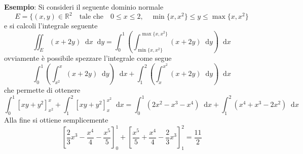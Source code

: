 \documentclass[a4paper]{extarticle}
\newcommand*\dif{\mathop{}\!\mathrm{d}}
\begin{document}
\vspace{2em}
\noindent
\textbf{Esempio}: Si consideri il seguente dominio normale
\[E=\{(x,y) \in \mathbb{R}^2 \hspace{1em} \text{tale che} \hspace{1em} 0 \leq x \leq 2, \hspace{1em} \min\{x,x^2\} \leq y \leq \max\{x,x^2\}\]
e si calcoli l'integrale seguente
\[\iint_E (x+2y) \dif x \dif y = \int_0^1 \left(\int_{\min\{x,x^2\}}^{\max\{x,x^2\}} (x+2y) \dif y\right) \dif x\]
ovviamente è possibile spezzare l'integrale come segue
\[\int_0^1 \left(\int_{x^2}^x (x+2y) \dif y\right) \dif x + \int_1^2 \left(\int_x^{x^2}(x+2y) \dif y\right)\dif x\]
che permette di ottenere
\[\int_0^1 \left[xy + y^2\right]_{x^2}^x + \int_1^2 \left[xy+y^2\right]_x^{x^2} \dif x = \int_0^1 (2x^2 - x^3 - x^4) \dif x + \int_1^2 (x^4+x^3-2x^2) \dif x\]
Alla fine si ottiene semplicemente
\[\left[\dfrac{2}{3} x^3 - \dfrac{x^4}{4} - \dfrac{x^5}{5}\right]_0^1 + \left[\dfrac{x^5}{5}+\dfrac{x^4}{4}-\dfrac{2}{3}x^3\right]_1^2 = \dfrac{11}{2}\]
\end{document}
